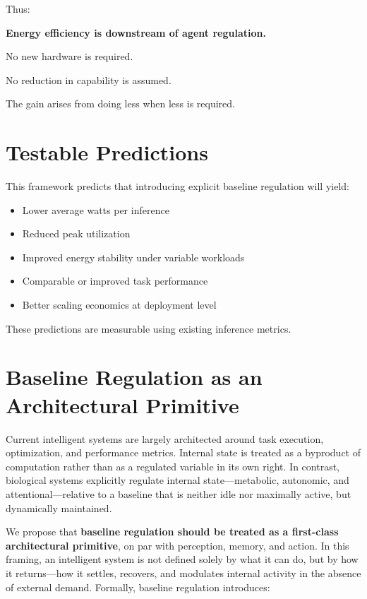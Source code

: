 \documentclass[11pt]{article}
\begin{document}
Thus: 

\hspace*{1.5em}\textbf{Energy efficiency is downstream of agent regulation.} 

No new hardware is required.

No reduction in capability is assumed. 

The gain arises from doing less when less is required.

\section{Testable Predictions}
This framework predicts that introducing explicit baseline regulation will yield:

\begin{itemize}
\item Lower average watts per inference

\item Reduced peak utilization

\item Improved energy stability under variable workloads

\item Comparable or improved task performance

\item Better scaling economics at deployment level

\end{itemize}
These predictions are measurable using existing inference metrics.

\section{Baseline Regulation as an Architectural Primitive}
Current intelligent systems are largely architected around task execution, optimization, and performance metrics. Internal state is treated as a byproduct of computation rather than as a regulated variable in its own right. In contrast, biological systems explicitly regulate internal state—metabolic, autonomic, and attentional—relative to a baseline that is neither idle nor maximally active, but dynamically maintained. 

We propose that \textbf{baseline regulation should be treated as a first-class architectural primitive}, on par with perception, memory, and action. In this framing, an intelligent system is not defined solely by what it can do, but by how it returns—how it settles, recovers, and modulates internal activity in the absence of external demand. Formally, baseline regulation introduces:
\end{document}

